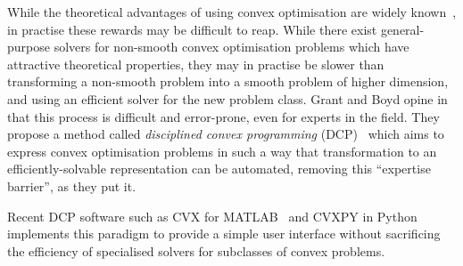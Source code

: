 While the theoretical advantages of using convex optimisation are widely known~\cite{Luo06}, in practise these rewards may be difficult to reap.
While there exist general-purpose solvers for non-smooth convex optimisation problems which have attractive theoretical properties, they may in practise be slower than transforming a non-smooth problem into a smooth problem of higher dimension, and using an efficient solver for the new problem class.
Grant and Boyd opine in~\cite{Grant08} that this process is difficult and error-prone, even for experts in the field.
They propose a method called \emph{disciplined convex programming} (DCP)~\cite{Grant06} which aims to express convex optimisation problems in such a way that transformation to an efficiently-solvable representation can be automated, removing this ``expertise barrier'', as they put it.

Recent DCP software such as CVX for MATLAB~\cite{CVX} and CVXPY in Python~\cite{CVXPY} implements this paradigm to provide a simple user interface without sacrificing the efficiency of specialised solvers for subclasses of convex problems.
